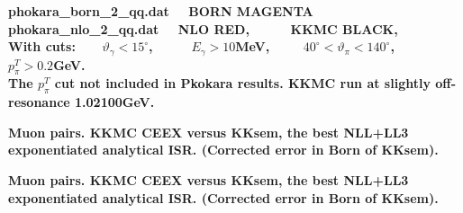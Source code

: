 \documentclass[dvips]{seminar}                      %
\begin{document}
\begin{slide}
\vspace{-3mm}
\begin{center}
\end{center}
\vspace{-2mm}
{\footnotesize\bf
  phokara\_born\_2\_qq.dat~~ {\cmg BORN MAGENTA} \\
  phokara\_nlo\_2\_qq.dat~~  {\red NLO RED},~~~~~ KKMC {\bf BLACK},\\  
  With cuts:~~~ $\vartheta_\gamma<15^\circ$, ~~~~
  $E_\gamma>10$MeV,~~~~
  $ 40^\circ <\vartheta_\pi< 140^\circ$,~~~~
  $p^T_\pi > 0.2$GeV.\\
  The $p^T_\pi$ cut not included in Pkokara results.
  KKMC run at slightly off-resonance 1.02100GeV.
}
\vfill
\end{slide}    %



\begin{slide}
\vspace{-3mm}
\begin{center}
\end{center}
\vspace{-2mm}
{\footnotesize\bf
  Muon pairs.
  KKMC {\crd CEEX} versus KKsem, the best NLL+LL3 exponentiated analytical ISR.
  (Corrected error in Born of KKsem).
}
\vfill
\end{slide}    %


\begin{slide}
\vspace{-3mm}
\begin{center}
\end{center}
\vspace{-2mm}
{\footnotesize\bf
  Muon pairs.
  KKMC {\crd CEEX} versus KKsem, the best NLL+LL3 exponentiated analytical ISR.
  (Corrected error in Born of KKsem).
}
\vfill
\end{slide}    %
\end{document}
